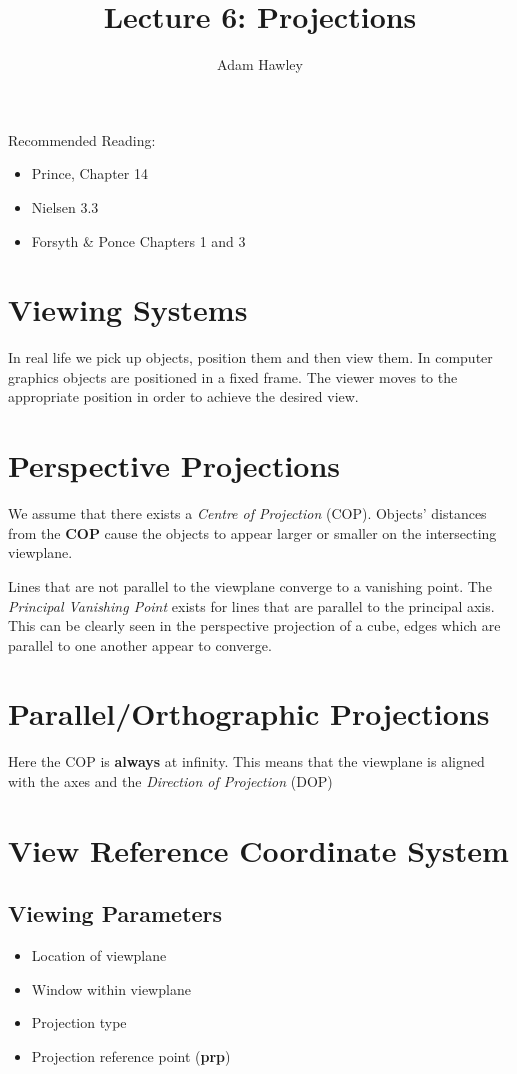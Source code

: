\documentclass{article}
\author{Adam Hawley}
\title{Lecture 6: Projections}
\begin{document}
\maketitle
Recommended Reading: 
\begin{itemize}
	\item Prince, Chapter 14 
	\item Nielsen 3.3
	\item Forsyth \& Ponce Chapters 1 and 3
\end{itemize}
\tableofcontents
\newpage

\section{Viewing Systems}
In real life we pick up objects, position them and then view them.
In computer graphics objects are positioned in a fixed frame.
The viewer moves to the appropriate position in order to achieve the desired view.

\section{Perspective Projections}
We assume that there exists a {\it Centre of Projection} (COP).
Objects' distances from the {\bf COP} cause the objects to appear larger or smaller on the intersecting viewplane. %

Lines that are not parallel to the viewplane converge to a vanishing point. 
The {\it Principal Vanishing Point} exists for lines that are parallel to the principal axis.  
This can be clearly seen in the perspective projection of a cube, edges which are parallel to one another appear to converge. %

\section{Parallel/Orthographic Projections}
Here the COP is {\bf always} at infinity.
This means that the viewplane is aligned with the axes and the {\it Direction of Projection} (DOP)

\section{View Reference Coordinate System}
\subsection{Viewing Parameters}
\begin{itemize}
	\item Location of viewplane
	\item Window within viewplane
	\item Projection type
	\item Projection reference point ({\bf prp})
\end{itemize} 
\end{document}
